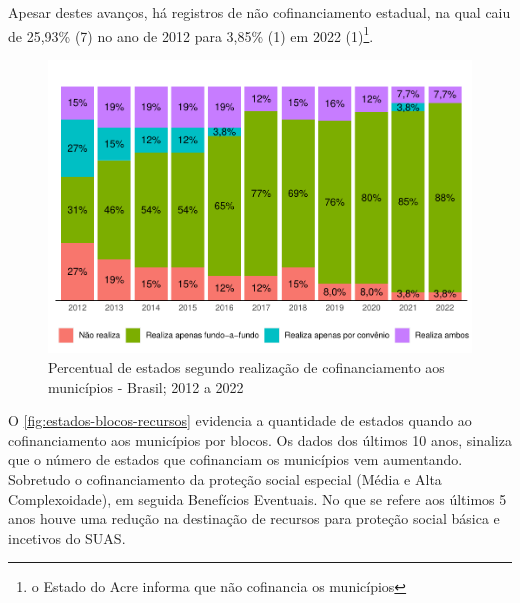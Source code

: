 \documentclass[
  brazilian]{report}
\begin{document}
Apesar destes avanços, há registros de não cofinanciamento estadual, na
qual caiu de 25,93\% (7) no ano de 2012 para 3,85\% (1) em 2022
(1)\footnote{o Estado do Acre informa que não cofinancia os municípios}.

\begin{figure}
\includegraphics{Censo-SUAS-2022_files/figure-latex/estados-cofinanciamento-municipios-1} \caption[Percentual de estados segundo realização de cofinanciamento aos municípios - Brasil]{Percentual de estados segundo realização de cofinanciamento aos municípios - Brasil; 2012 a 2022}\label{fig:estados-cofinanciamento-municipios}
\end{figure}

O \cref{fig:estados-blocos-recursos} evidencia a quantidade de estados
quando ao cofinanciamento aos municípios por blocos. Os dados dos
últimos 10 anos, sinaliza que o número de estados que cofinanciam os
municípios vem aumentando. Sobretudo o cofinanciamento da proteção
social especial (Média e Alta Complexoidade), em seguida Benefícios
Eventuais. No que se refere aos últimos 5 anos houve uma redução na
destinação de recursos para proteção social básica e incetivos do SUAS.
\end{document}
